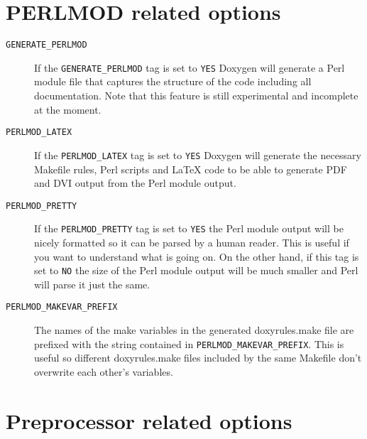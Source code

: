 \hypertarget{config_perlmod_output}{}\section{PERLMOD related options}\label{config_perlmod_output}
\label{config_cfg_generate_perlmod}
\hypertarget{config_cfg_generate_perlmod}{}
 \begin{description}
\item[{\tt GENERATE\_\-PERLMOD} ] If the {\tt GENERATE\_\-PERLMOD} tag is set to {\tt YES} Doxygen will generate a Perl module file that captures the structure of the code including all documentation. Note that this feature is still experimental and incomplete at the moment.

\label{config_cfg_perlmod_latex}
\hypertarget{config_cfg_perlmod_latex}{}
 \item[{\tt PERLMOD\_\-LATEX} ] If the {\tt PERLMOD\_\-LATEX} tag is set to {\tt YES} Doxygen will generate the necessary Makefile rules, Perl scripts and LaTeX code to be able to generate PDF and DVI output from the Perl module output.

\label{config_cfg_perlmod_pretty}
\hypertarget{config_cfg_perlmod_pretty}{}
 \item[{\tt PERLMOD\_\-PRETTY} ] If the {\tt PERLMOD\_\-PRETTY} tag is set to {\tt YES} the Perl module output will be nicely formatted so it can be parsed by a human reader. This is useful if you want to understand what is going on. On the other hand, if this tag is set to {\tt NO} the size of the Perl module output will be much smaller and Perl will parse it just the same.

\label{config_cfg_perlmod_makevar_prefix}
\hypertarget{config_cfg_perlmod_makevar_prefix}{}
 \item[{\tt PERLMOD\_\-MAKEVAR\_\-PREFIX} ] The names of the make variables in the generated doxyrules.make file are prefixed with the string contained in {\tt PERLMOD\_\-MAKEVAR\_\-PREFIX}. This is useful so different doxyrules.make files included by the same Makefile don't overwrite each other's variables.

\end{description}
\hypertarget{config_config_prepro}{}\section{Preprocessor related options}\label{config_config_prepro}
